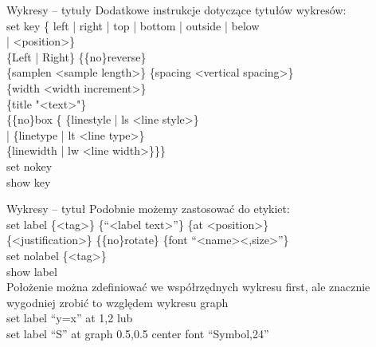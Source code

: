 \documentclass{beamer}
\begin{document}
\begin{frame}{Wykresy -- tytuły}
Dodatkowe instrukcje dotyczące tytułów wykresów:\\
{\color{blue}
set key \{  left | right | top | bottom | outside | below \\
 \hspace{1cm}              | <position>\} \\
 \hspace{1cm}             \{Left | Right\} \{\{no\}reverse\} \\
 \hspace{1cm}             \{samplen <sample length>\} \{spacing <vertical spacing>\} \\
 \hspace{1cm}             \{width <width increment>\} \\
 \hspace{1cm}             \{title "<text>"\} \\
 \hspace{1cm}             \{\{no\}box \{ \{linestyle | ls <line style>\} \\
 \hspace{1cm}                        | \{linetype | lt <line type>\} \\
 \hspace{2cm}                          \{linewidth | lw <line width>\}\}\} \\
      set nokey \\
      show key \\
}
\end{frame}

\begin{frame}{Wykresy -- tytuł}
\vspace{0.5cm}
Podobnie możemy zastosować do etykiet: \\
{\color{blue}  set label \{<tag>\} \{"`<label text>"'\} \{at <position>\} \\
 \hspace{1cm}               \{<justification>\} \{\{no\}rotate\} \{font "`<name><,size>"'\} \\
\hspace{1cm}      set nolabel \{<tag>\} \\
\hspace{1cm}      show label \\
}
Położenie można zdefiniować we współrzędnych wykresu {\color{blue} first}, ale znacznie wygodniej zrobić to względem wykresu {\color{blue} graph} \\
{\color{blue} set label "`y=x"' at 1,2 } lub \\ 
{\color{blue} set label "`S"' at graph 0.5,0.5 center font "`Symbol,24"'}
\end{frame}
\end{document}
